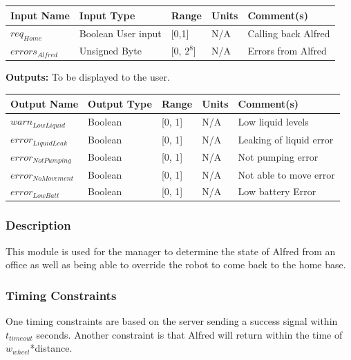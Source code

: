 \documentclass [10pt]{article}
\begin{document}
\begin{longtable}{|l|l|l|l|l|}\hline 
	\rowcolor{tableCell}\textbf{Input Name} & \textbf{Input Type} & \textbf{Range} & \textbf{Units} & \textbf{Comment(s)} \\ \hline
	$ req_{Home} $ & Boolean User input &  [0,1] & N/A & Calling back Alfred \\ \hline
	\rowcolor{tableCell}$  errors_{Alfred} $ & Unsigned Byte & [0, $2^{8}$]& N/A & Errors from Alfred \\ \hline
\end{longtable}


\textbf{Outputs: } To be displayed to the user.\\
\begin{longtable}{|l|l|l|l|l|}\hline 
	\rowcolor{tableCell}\textbf{Output Name} & \textbf{Output Type} & \textbf{Range} & \textbf{Units} & \textbf{Comment(s)} \\ \hline
	$  warn_{LowLiquid} $ & Boolean & [0, 1]& N/A & Low liquid levels \\ \hline
	\rowcolor{tableCell}$  error_{LiquidLeak} $ & Boolean & [0, 1]& N/A & Leaking of liquid error \\ \hline
	$  error_{NotPumping} $ & Boolean & [0, 1]& N/A & Not pumping error \\ \hline
	\rowcolor{tableCell}$  error_{NoMovement} $ & Boolean & [0, 1]& N/A & Not able to move error \\ \hline
	$  error_{LowBatt} $ & Boolean & [0, 1]& N/A & Low battery Error \\ \hline
\end{longtable}


\subsubsection{Description}
This module is used for the manager to determine the state of Alfred from an office as well as being able to override the robot to come back to the home base. 
\subsubsection{Timing Constraints}
One timing constraints are based on the server sending a success signal within  $ t_{timeout} $ seconds. Another constraint is that Alfred will return within the time of $ w_{wheel} $*distance.
\end{document}
